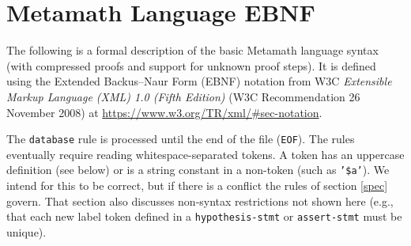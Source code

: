 \chapter{Metamath Language EBNF}%
\label{BNF}%

The following is a formal description of the basic Metamath language syntax
(with compressed proofs and support for unknown proof steps).
It is defined using the
Extended Backus--Naur Form (EBNF)
notation from W3C
\textit{Extensible Markup Language (XML) 1.0 (Fifth Edition)}
(W3C Recommendation 26 November 2008) at
\url{https://www.w3.org/TR/xml/#sec-notation}.

The \texttt{database}
rule is processed until the end of the file (\texttt{EOF}).
The rules eventually require reading whitespace-separated tokens.
A token has an uppercase definition (see below)
or is a string constant in a non-token (such as \texttt{'\$a'}).
We intend for this to be correct, but if there is a conflict the
rules of section \ref{spec} govern. That section also discusses
non-syntax restrictions not shown here
(e.g., that each new label token
defined in a \texttt{hypothesis-stmt} or \texttt{assert-stmt}
must be unique).

